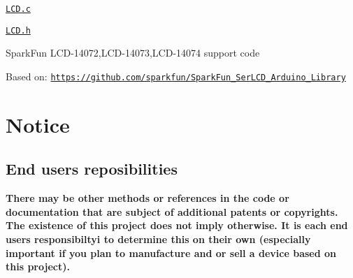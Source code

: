 \begin{DoxyItemize}
\item \href{hardware/LCD.c}{\tt L\+C\+D.\+c}
\item \href{hardware/LCD.h}{\tt L\+C\+D.\+h}
\begin{DoxyItemize}
\item Spark\+Fun L\+C\+D-\/14072,L\+C\+D-\/14073,L\+C\+D-\/14074 support code
\item Based on\+: \href{https://github.com/sparkfun/SparkFun_SerLCD_Arduino_Library}{\tt https\+://github.\+com/sparkfun/\+Spark\+Fun\+\_\+\+Ser\+L\+C\+D\+\_\+\+Arduino\+\_\+\+Library}
\end{DoxyItemize}
\end{DoxyItemize}





\section*{Notice}

\subsection*{End users reposibilities}

{\bfseries There may be other methods or references in the code or documentation that are subject of additional patents or copyrights. The existence of this project does not imply otherwise. It is each end users responsibiltyi to determine this on their own (especially important if you plan to manufacture and or sell a device based on this project).} 